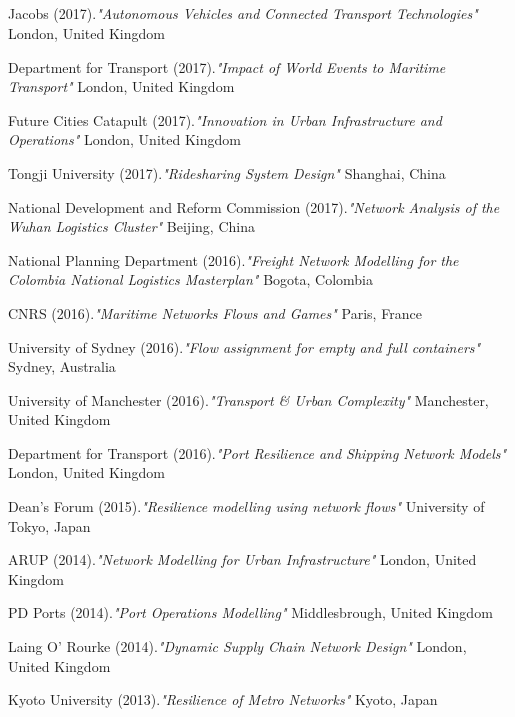 \documentclass[margin]{res}
\begin{document}
\begin{resume}
\section{}
\begin{etaremune}
\renewcommand\labelenumi{T\theenumi. }
	\item
	Jacobs (2017).\textit{"{Autonomous Vehicles and Connected Transport Technologies}"} London, United Kingdom
	\item
	Department for Transport (2017).\textit{"{Impact of World Events to Maritime Transport}"} London, United Kingdom
	\item
	Future Cities Catapult (2017).\textit{"{Innovation in Urban Infrastructure and Operations}"} London, United Kingdom
	\item
	Tongji University (2017).\textit{"{Ridesharing System Design}"} Shanghai, China
	\item
	National Development and Reform Commission (2017).\textit{"{Network Analysis of the Wuhan Logistics Cluster}"} Beijing, China
	\item
	National Planning Department (2016).\textit{"{Freight Network Modelling for the Colombia National Logistics Masterplan}"} Bogota, Colombia
	\item
	CNRS (2016).\textit{"{Maritime Networks Flows and Games}"} Paris, France
	\item
	University of Sydney (2016).\textit{"{Flow assignment for empty and full containers}"} Sydney, Australia
	\item
	University of Manchester (2016).\textit{"{Transport \& Urban Complexity}"} Manchester, United Kingdom
	\item
	Department for Transport (2016).\textit{"{Port Resilience and Shipping Network Models}"} London, United Kingdom
	\item
	Dean's Forum (2015).\textit{"{Resilience modelling using network flows}"} University of Tokyo, Japan
	\item
	ARUP (2014).\textit{"{Network Modelling for Urban Infrastructure}"} London, United Kingdom
	\item
	PD Ports (2014).\textit{"{Port Operations Modelling}"} Middlesbrough, United Kingdom
	\item
	Laing O' Rourke (2014).\textit{"{Dynamic Supply Chain Network Design}"} London, United Kingdom
	\item
	Kyoto University (2013).\textit{"{Resilience of Metro Networks}"} Kyoto, Japan
	\item

\end{etaremune}
\end{resume}
\end{document}
